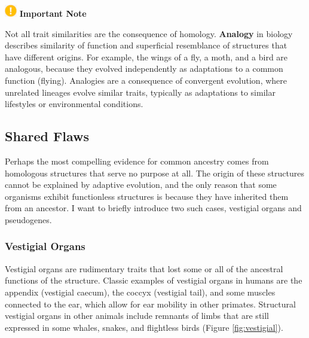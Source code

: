 \documentclass[
]{book}
\begin{document}
\includegraphics[width=0.20833in,height=\textheight]{images/important.png} \textbf{Important Note}

Not all trait similarities are the consequence of homology. \textbf{Analogy} in biology describes similarity of function and superficial resemblance of structures that have different origins. For example, the wings of a fly, a moth, and a bird are analogous, because they evolved independently as adaptations to a common function (flying). Analogies are a consequence of convergent evolution, where unrelated lineages evolve similar traits, typically as adaptations to similar lifestyles or environmental conditions.

\hypertarget{shared-flaws}{%
\subsection{Shared Flaws}\label{shared-flaws}}

Perhaps the most compelling evidence for common ancestry comes from homologous structures that serve no purpose at all. The origin of these structures cannot be explained by adaptive evolution, and the only reason that some organisms exhibit functionless structures is because they have inherited them from an ancestor. I want to briefly introduce two such cases, vestigial organs and pseudogenes.

\hypertarget{vestigial-organs}{%
\subsubsection*{Vestigial Organs}\label{vestigial-organs}}

Vestigial organs are rudimentary traits that lost some or all of the ancestral functions of the structure. Classic examples of vestigial organs in humans are the appendix (vestigial caecum), the coccyx (vestigial tail), and some muscles connected to the ear, which allow for ear mobility in other primates. Structural vestigial organs in other animals include remnants of limbs that are still expressed in some whales, snakes, and flightless birds (Figure \ref{fig:vestigial}).
\end{document}
